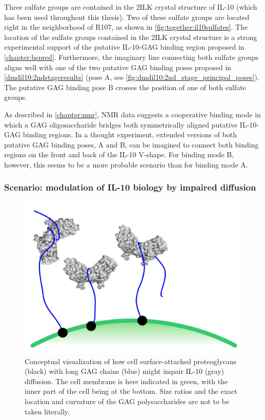 Three sulfate groups are contained in the 2ILK crystal structure of IL-10 (which
has been used throughout this thesis). Two of these sulfate groups are located
right in the neighborhood of R107, as shown in \cref{fig:together:il10sulfates}.
The location of the sulfate groups contained in the 2ILK crystal structure is a
strong experimental support of the putative IL-10-GAG binding region proposed in
\cref{chapter:bspred}. Furthermore, the imaginary line connecting both sulfate
groups aligns well with one of the two putative GAG binding poses proposed in
\cref{dmdil10:2ndstageresults} (pose A, see
\cref{fig:dmdil10:2nd_stage_principal_poses}). The putative GAG binding pose B
crosses the position of one of both sulfate groups.

As described in \cref{chapter:nmr}, NMR data suggests a cooperative binding mode
in which a GAG oligosaccharide bridges both symmetrically aligned putative
IL-10-GAG binding regions. In a thought experiment, extended versions of both
putative GAG binding poses, A and B, can be imagined to connect both binding
regions on the front and back of the IL-10 V-shape. For binding mode B, however,
this seems to be a more probable scenario than for binding mode A.


\subsubsection{Scenario: modulation of IL-10 biology by impaired diffusion}

\begin{figure}
\centering
\includegraphics[width=1.0\textwidth]{gfx/together/agglomeration_small.jpg}
\caption[]{
Conceptual visualization of how cell surface-attached proteoglycans (black) with
long GAG chains (blue) might impair IL-10 (gray) diffusion. The cell membrane is
here indicated in green, with the inner part of the cell being at the bottom.
Size ratios and the exact location and curvature of the GAG polysaccharides are
not to be taken literally.}
\label{fig:together:diffusionimpaired}
\end{figure}

